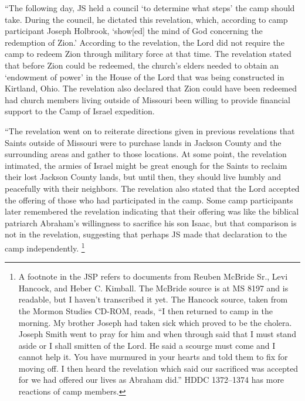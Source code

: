 			``The following day, JS held a council `to determine what steps' the camp should take. During the council, he dictated this revelation, which, according to camp participant Joseph Holbrook, `show[ed] the mind of God concerning the redemption of Zion.' According to the revelation, the Lord did not require the camp to redeem Zion through military force at that time. The revelation stated that before Zion could be redeemed, the church's elders needed to obtain an `endowment of power' in the House of the Lord that was being constructed in Kirtland, Ohio. The revelation also declared that Zion could have been redeemed had church members living outside of Missouri been willing to provide financial support to the Camp of Israel expedition.
			
			``The revelation went on to reiterate directions given in previous revelations that Saints outside of Missouri were to purchase lands in Jackson County and the surrounding areas and gather to those locations. At some point, the revelation intimated, the armies of Israel might be great enough for the Saints to reclaim their lost Jackson County lands, but until then, they should live humbly and peacefully with their neighbors. The revelation also stated that the Lord accepted the offering of those who had participated in the camp. Some camp participants later remembered the revelation indicating that their offering was like the biblical patriarch Abraham's willingness to sacrifice his son Isaac, but that comparison is not in the revelation, suggesting that perhaps JS made that declaration to the camp independently.%
				\footnote{%
					A footnote in the JSP refers to documents from Reuben McBride Sr., Levi Hancock, and Heber C. Kimball.
					The McBride source is at MS 8197 and is readable, but I haven't transcribed it yet.
					The Hancock source, taken from the Mormon Studies CD-ROM, reads, ``I then returned to camp in the morning. My brother Joseph had taken sick which proved to be the cholera. Joseph Smith went to pray for him and when through said that I must stand aside or I shall smitten of the Lord. He said a scourge must come and I cannot help it. You have murmured in your hearts and told them to fix for moving off. I then heard the revelation which said our sacrificed was accepted for we had offered our lives as Abraham did.''
					HDDC 1372--1374 has more reactions of camp members.
					}
			
